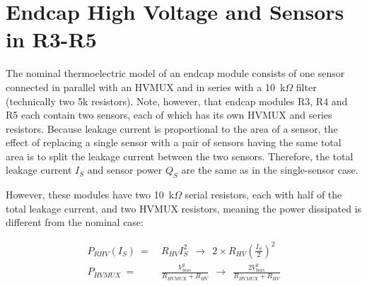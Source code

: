 
\section{Endcap High Voltage and Sensors in R3-R5}
\label{highvoltage}

The nominal thermoelectric model of an endcap module consists of one sensor connected in parallel with
an HVMUX and in series with a 10~k$\Omega$ filter (technically two 5k resistors).
Note, however, that endcap modules R3, R4 and R5 each contain two sensors, each of which has its own
HVMUX and series resistors. Because leakage current is proportional to the area of a sensor,
the effect of replacing a single sensor with a pair of sensors having the same total area is to split
the leakage current between the two sensors. Therefore, the total leakage current $I_S$ and sensor
power $Q_S$ are the same as in the single-sensor case.

However, these modules have two 10~k$\Omega$ serial resistors, each with half of the total
leakage current, and two HVMUX resistors, meaning the power dissipated is different from the nominal
case:

\begin{align}
P_{RHV}(I_S) ~=~& R_{HV}I_S^2~~\rightarrow~~ 2\times R_{HV}\left(\frac{I_S}{2}\right)^2 \\
P_{HVMUX} ~=~& \frac{ V^2_{bias} }{R_{HVMUX} + R_{HV}} ~~\rightarrow~~ 
             \frac{2V^2_{bias} }{R_{HVMUX} + R_{HV}}
\end{align}
